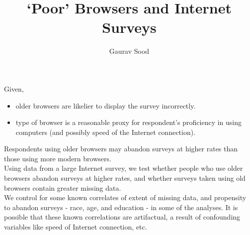 \documentclass[doc,fignum]{apa}
\begin{document}
\pagestyle{headings}
\title{`Poor' Browsers and Internet Surveys}
\author{Gaurav Sood}
\maketitle

\linespread{1.3}
Given,
\begin{itemize}
	\item older browsers are likelier to display the survey incorrectly.
	\item type of browser is a reasonable proxy for respondent's proficiency in using computers (and possibly speed of the 
	Internet connection).
\end{itemize}

Respondents using older browsers may abandon surveys at higher rates than those using more modern browsers.\\

Using data from a large Internet survey, we test whether people who use older browsers abandon surveys at 
higher rates, and whether surveys taken using old browsers contain greater missing data.\\
 
We control for some known correlates of extent of missing data, and propensity to abandon surveys - race, age, and 
education - in some of the analyses. It is possible that these known correlations are artifactual, a result of 
confounding variables like speed of Internet connection, etc. 
   
\end{document}
